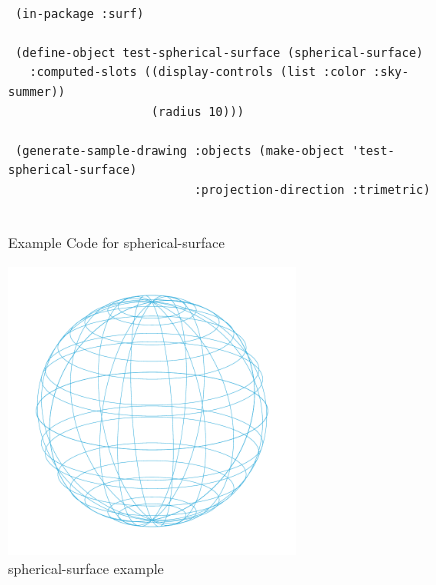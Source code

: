 \documentclass [11pt]{book}
\begin{document}
\begin{itemize}
\begin{figure}
\begin{lrbox}{\boxedverb}
\begin{minipage}{\linewidth}
{\small

\begin{verbatim}
                  
 (in-package :surf)

 (define-object test-spherical-surface (spherical-surface)
   :computed-slots ((display-controls (list :color :sky-summer))
                    (radius 10)))

 (generate-sample-drawing :objects (make-object 'test-spherical-surface)
                          :projection-direction :trimetric)


\end{verbatim}}
\end{minipage}
\end{lrbox}
\fbox{\usebox{\boxedverb}}

\caption{Example Code for spherical-surface}

\label{fig:example-code-spherical-surface}

\end{figure}

\begin{figure}
\begin{center}
\includegraphics[width=3in,height=3in]{../images/example-spherical-surface.pdf}
\end{center}

\caption{spherical-surface example}

\label{fig:spherical-surface}

\end{figure}






\end{itemize}
\end{document}
